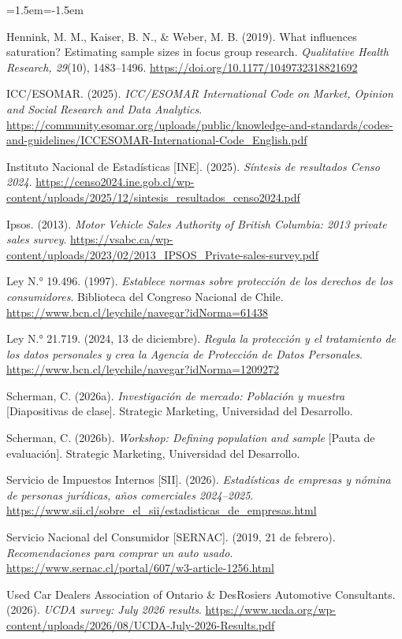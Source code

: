\documentclass[11pt,a4paper]{article}
\begin{document}
\begin{list}{}{\leftmargin=1.5em\itemindent=-1.5em\itemsep=3pt}
\item Hennink, M. M., Kaiser, B. N., \& Weber, M. B. (2019). What influences saturation? Estimating sample sizes in focus group research. \emph{Qualitative Health Research, 29}(10), 1483–1496. \url{https://doi.org/10.1177/1049732318821692}
\item ICC/ESOMAR. (2025). \emph{ICC/ESOMAR International Code on Market, Opinion and Social Research and Data Analytics}. \url{https://community.esomar.org/uploads/public/knowledge-and-standards/codes-and-guidelines/ICCESOMAR-International-Code_English.pdf}
\item Instituto Nacional de Estadísticas [INE]. (2025). \emph{Síntesis de resultados Censo 2024}. \url{https://censo2024.ine.gob.cl/wp-content/uploads/2025/12/sintesis_resultados_censo2024.pdf}
\item Ipsos. (2013). \emph{Motor Vehicle Sales Authority of British Columbia: 2013 private sales survey}. \url{https://vsabc.ca/wp-content/uploads/2023/02/2013_IPSOS_Private-sales-survey.pdf}
\item Ley N.° 19.496. (1997). \emph{Establece normas sobre protección de los derechos de los consumidores}. Biblioteca del Congreso Nacional de Chile. \url{https://www.bcn.cl/leychile/navegar?idNorma=61438}
\item Ley N.° 21.719. (2024, 13 de diciembre). \emph{Regula la protección y el tratamiento de los datos personales y crea la Agencia de Protección de Datos Personales}. \url{https://www.bcn.cl/leychile/navegar?idNorma=1209272}
\item Scherman, C. (2026a). \emph{Investigación de mercado: Población y muestra} [Diapositivas de clase]. Strategic Marketing, Universidad del Desarrollo.
\item Scherman, C. (2026b). \emph{Workshop: Defining population and sample} [Pauta de evaluación]. Strategic Marketing, Universidad del Desarrollo.
\item Servicio de Impuestos Internos [SII]. (2026). \emph{Estadísticas de empresas y nómina de personas jurídicas, años comerciales 2024–2025}. \url{https://www.sii.cl/sobre_el_sii/estadisticas_de_empresas.html}
\item Servicio Nacional del Consumidor [SERNAC]. (2019, 21 de febrero). \emph{Recomendaciones para comprar un auto usado}. \url{https://www.sernac.cl/portal/607/w3-article-1256.html}
\item Used Car Dealers Association of Ontario \& DesRosiers Automotive Consultants. (2026). \emph{UCDA survey: July 2026 results}. \url{https://www.ucda.org/wp-content/uploads/2026/08/UCDA-July-2026-Results.pdf}
\end{list}
\end{document}
